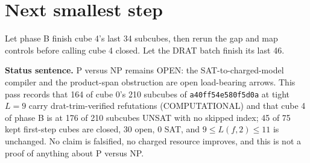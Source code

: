 \documentclass[11pt]{article}
\begin{document}
\section*{Next smallest step}
Let phase B finish cube 4's last 34 subcubes, then rerun the gap and map controls before calling cube 4 closed. Let the DRAT batch finish its last 46.

\bigskip
\noindent\textbf{Status sentence.} P versus NP remains OPEN: the SAT-to-charged-model compiler and the product-span obstruction are open load-bearing arrows. This pass records that 164 of cube 0's 210 subcubes of \texttt{a40ff54e580f5d0a} at tight $L=9$ carry drat-trim-verified refutations (COMPUTATIONAL) and that cube 4 of phase B is at 176 of 210 subcubes UNSAT with no skipped index; 45 of 75 kept first-step cubes are closed, 30 open, 0 SAT, and $9\le L(f,2)\le 11$ is unchanged. No claim is falsified, no charged resource improves, and this is not a proof of anything about P versus NP.
\end{document}
